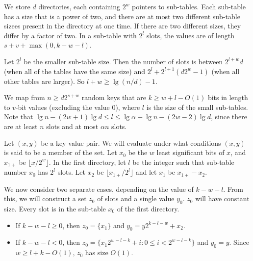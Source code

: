 \documentclass[11pt,letterpaper]{article}
\begin{document}
We store $d$ directories, each containing $2^w$ pointers to sub-tables.
Each sub-table has a size that is a power of two, and there are at most two different sub-table sizees present in the directory at one time.
If there are two different sizes, they differ by a factor of two.
In a sub-table with $2^l$ slots, the values are of length $s + v + \max(0,k - w - l)$.

Let $2^l$ be the smaller sub-table size.
Then the number of slots is between $2^{l+w}d$ (when all of the tables have the same size) and $2^l + 2^{l+1}(d 2^w - 1)$ (when all other tables are larger).
So $l + w \geq \lg(n/d) - 1$.


We map from $n \geq d 2^{s+w}$ random keys that are $k \geq w + l - O(1)$ bits in length to $v$-bit values (excluding the value $0$), where $l$ is the size of the small sub-tables.
Note that $\lg n - (2w + 1) \lg d \leq l \leq \lg \alpha + \lg n - (2w - 2)\lg d$, since there are at least $n$ slots and at most $\alpha n$ slots.


Let $(x,y)$ be a key-value pair.
We will evaluate under what conditions $(x,y)$ is said to be a member of the set.
Let $x_0$ be the $w$ least significant bits of $x$, and $x_{1+}$ be $\lfloor x / 2^w \rfloor$.
In the first directory, let $l$ be the integer such that sub-table number $x_0$ has $2^l$ slots.
Let $x_2$ be $\lfloor x_{1+} / 2^l \rfloor$ and let $x_1$ be $x_{1+} - x_2$.

We now consider two separate cases, depending on the value of $k - w - l$.
From this, we will construct a set $z_0$ of slots and a single value $y_0$.
$z_0$ will have constant size.
Every slot is in the sub-table $x_0$ of the first directory.

\begin{itemize}
\item If $k - w - l \geq 0$, then $z_0 = \{x_1\}$ and $y_0 = y 2^{k - l - w} + x_2$.
\item If $k - w - l < 0$, then $z_0 = \{x_1 2^{w - l - k} + i : 0 \leq i < 2^{w-l-k}\}$ and $y_0 = y$.
  Since $w \geq l + k - O(1)$, $z_0$ has size $O(1)$.
\end{itemize}
\end{document}
